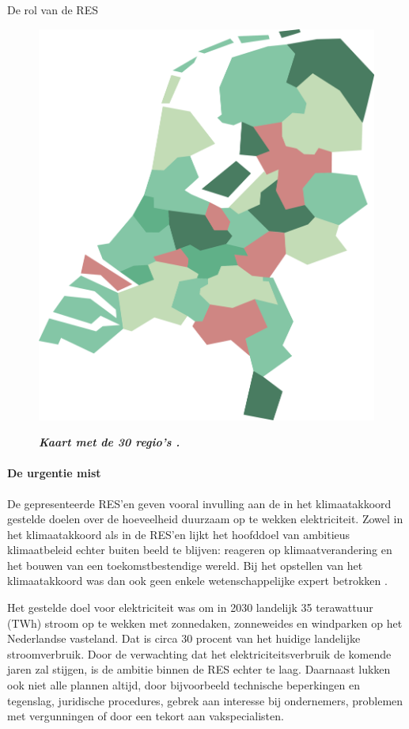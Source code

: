 \begin{voorstel}{De rol van de RES}
\begin{multicols*}{2}
\begin{overwegingen}
\begin{figure}[H]
	\begin{center}
		\includegraphics[width=.8\columnwidth]{img/energie/rol-van-de-res-kaart}
	\end{center}
	\textbf{\textit{Kaart met de 30 regio's \parencite{nationaal_programma_res_handreiking_2019}.}}
\end{figure}

\paragraph{De urgentie mist}
De gepresenteerde RES'en geven vooral invulling aan de in het klimaatakkoord gestelde doelen over de hoeveelheid duurzaam op te wekken elektriciteit.
Zowel in het klimaatakkoord als in de RES'en lijkt het hoofddoel van ambitieus klimaatbeleid echter buiten beeld te blijven: reageren op klimaatverandering en het bouwen van een toekomstbestendige wereld. Bij het opstellen van het klimaatakkoord was dan ook geen enkele wetenschappelijke expert betrokken \parencite{kropman_hoe_2019}.

Het gestelde doel voor elektriciteit was om in 2030 landelijk 35 terawattuur (TWh) stroom op te wekken met zonnedaken, zonneweides en windparken op het Nederlandse vasteland. Dat is circa 30 procent van het huidige landelijke stroomverbruik.
Door de verwachting dat het elektriciteitsverbruik de komende jaren zal stijgen, is de ambitie binnen de RES echter te laag.
Daarnaast lukken ook niet alle plannen altijd, door bijvoorbeeld technische beperkingen en tegenslag, juridische procedures, gebrek aan interesse bij ondernemers, problemen met vergunningen of door een tekort aan vakspecialisten.


\end{overwegingen}
\end{multicols*}
\end{voorstel}

